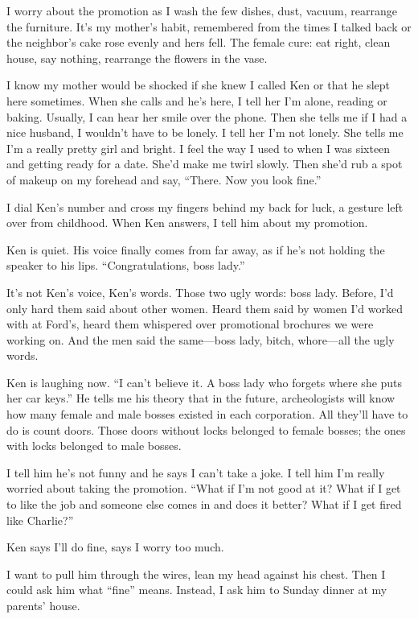 \documentclass[twoside,10pt]{book}
\begin{document}
I worry about the promotion as I wash the few dishes, dust, vacuum,
rearrange the furniture. It's my mother's habit, remembered from the
times I talked back or the neighbor's cake rose evenly and hers fell.
The female cure: eat right, clean house, say nothing, rearrange the
flowers in the vase.

I know my mother would be shocked if she knew I called Ken or that he
slept here some­times. When she calls and he's here, I tell her I'm
alone, reading or baking. Usually, I can hear her smile over the phone.
Then she tells me if I had a nice husband, I wouldn't have to be lonely.
I tell her I'm not lonely. She tells me I'm a really pretty girl and
bright. I feel the way I used to when I was sixteen and getting ready
for a date. She'd make me twirl slowly. Then she'd rub a spot of makeup
on my forehead and say, ``There. Now you look fine.''

I dial Ken's number and cross my fingers behind my back for luck, a
gesture left over from childhood. When Ken answers, I tell him about my
promotion.

Ken is quiet. His voice finally comes from far away, as if he's not
holding the speaker to his lips. ``Congratulations, boss lady.''

It's not Ken's voice, Ken's words. Those two ugly words: boss lady.
Before, I'd only hard them said about other women. Heard them said by
women I'd worked with at Ford's, heard them whis­pered over promotional
brochures we were working on. And the men said the same---boss lady,
bitch, whore---all the ugly words.

Ken is laughing now. ``I can't believe it. A boss lady who forgets where
she puts her car keys.'' He tells me his theory that in the future,
archeologists will know how many female and male bosses existed in each
corporation. All they'll have to do is count doors. Those doors without
locks belonged to female bosses; the ones with locks belonged to male
bosses.

I tell him he's not funny and he says I can't take a joke. I tell him
I'm really worried about tak­ing the promotion. ``What if I'm not good
at it? What if I get to like the job and someone else comes in and does
it better? What if I get fired like Charlie?''

Ken says I'll do fine, says I worry too much.

I want to pull him through the wires, lean my head against his chest.
Then I could ask him what ``fine'' means. Instead, I ask him to Sunday
dinner at my parents' house.
\end{document}
